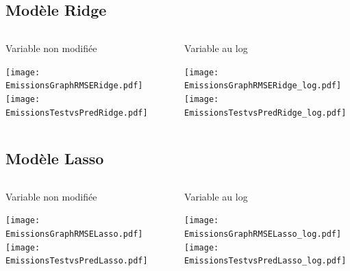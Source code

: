 \documentclass[8pt,aspectratio=169,hyperref={unicode=true}]{beamer}
\begin{document}
\subsection{Modèle Ridge}
\begin{frame}[t]{\insertsubsection}
  \begin{columns}
    \begin{column}{.33\textwidth}
      {\centering Variable non modifiée

      }
      \texttt{[image: EmissionsGraphRMSERidge.pdf]}
      \texttt{[image: EmissionsTestvsPredRidge.pdf]}
    \end{column}
    \begin{column}{.33\textwidth}

    \end{column}
    \begin{column}{.33\textwidth}
      {\centering Variable au log

      }
      \texttt{[image: EmissionsGraphRMSERidge\_log.pdf]}
      \texttt{[image: EmissionsTestvsPredRidge\_log.pdf]}
    \end{column}
  \end{columns}
\end{frame}

\subsection{Modèle Lasso}
\begin{frame}[t]{\insertsubsection}
  \begin{columns}
    \begin{column}{.33\textwidth}
      {\centering Variable non modifiée

      }
      \texttt{[image: EmissionsGraphRMSELasso.pdf]}
      \texttt{[image: EmissionsTestvsPredLasso.pdf]}
    \end{column}
    \begin{column}{.33\textwidth}

    \end{column}
    \begin{column}{.33\textwidth}
      {\centering Variable au log

      }
      \texttt{[image: EmissionsGraphRMSELasso\_log.pdf]}
      \texttt{[image: EmissionsTestvsPredLasso\_log.pdf]}
    \end{column}
  \end{columns}
\end{frame}
\end{document}
